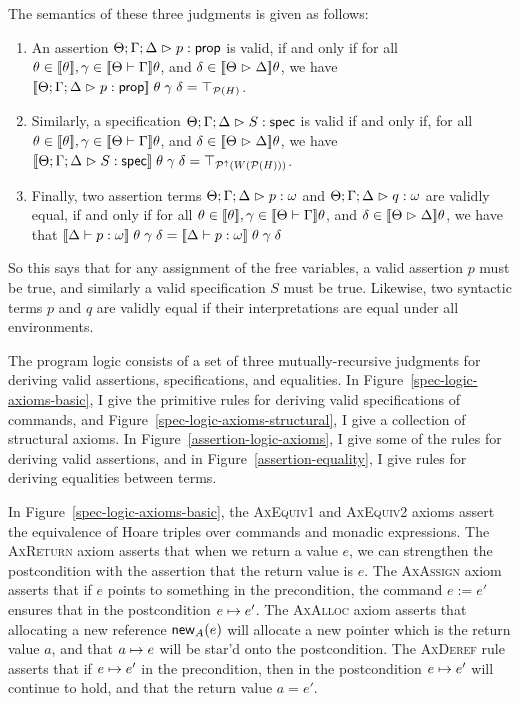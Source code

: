 \noindent The semantics of these three judgments is given as follows:
\begin{enumerate}
\item An assertion ${\Theta; \Gamma; \Delta} \vartriangleright {p} : {\mathsf{prop}}$ is valid, if and only
  if for all $\theta \in [\![{\theta}]\!], \gamma \in
  [\![{{\Theta} \vdash {\Gamma}}]\!]\theta$, and $\delta \in
  [\![{{\Theta} \vartriangleright {\Delta}}]\!]\theta$, we have
  $[\![{{\Theta; \Gamma; \Delta} \vartriangleright {p} : {\mathsf{prop}}}]\!]\;\theta\;\gamma\;\delta = \top_{\mathcal{P}(H)}$.

\item Similarly, a specification ${\Theta; \Gamma; \Delta} \vartriangleright {S} : \mathsf{spec}$ is valid if and only
if, for all $\theta \in [\![{\theta}]\!], \gamma \in
  [\![{{\Theta} \vdash {\Gamma}}]\!]\theta$, and $\delta \in
  [\![{{\Theta} \vartriangleright {\Delta}}]\!]\theta$, we have
$[\![{{\Theta; \Gamma; \Delta} \vartriangleright {S} : \mathsf{spec}}]\!]\;\theta\;\gamma\;\delta = \top_{\mathcal{P}^{\uparrow}({W(\mathcal{P}(H))})}$.

\item Finally, two assertion terms ${\Theta; \Gamma; \Delta} \vartriangleright {p} : {\omega}$ and
${\Theta; \Gamma; \Delta} \vartriangleright {q} : {\omega}$ are validly equal, if and only if for all 
$\theta \in [\![{\theta}]\!], \gamma \in
  [\![{{\Theta} \vdash {\Gamma}}]\!]\theta$, and $\delta \in
  [\![{{\Theta} \vartriangleright {\Delta}}]\!]\theta$, we have that
$[\![{{\Delta} \vdash {p} : {\omega}}]\!]\;\theta\;\gamma\;\delta = [\![{{\Delta} \vdash {p} : {\omega}}]\!]\;\theta\;\gamma\;\delta$
\end{enumerate}

So this says that for any assignment of the free variables, a valid
assertion $p$ must be true, and similarly a valid specification $S$
must be true. Likewise, two syntactic terms $p$ and $q$ are validly
equal if their interpretations are equal under all environments. 

The program logic consists of a set of three mutually-recursive
judgments for deriving valid assertions, specifications, and
equalities. In Figure~\ref{spec-logic-axioms-basic}, I give the
primitive rules for deriving valid specifications of commands, and
Figure~\ref{spec-logic-axioms-structural}, I give a collection of
structural axioms.  In Figure~\ref{assertion-logic-axioms}, I give
some of the rules for deriving valid assertions, and in
Figure~\ref{assertion-equality}, I give rules for deriving equalities
between terms.

In Figure~\ref{spec-logic-axioms-basic}, the \textsc{AxEquiv1} and
\textsc{AxEquiv2} axioms assert the equivalence of Hoare triples over
commands and monadic expressions.  The \textsc{AxReturn} axiom asserts
that when we return a value $e$, we can strengthen the postcondition
with the assertion that the return value is $e$. The \textsc{AxAssign}
axiom asserts that if $e$ points to something in the precondition, the
command $e := e'$ ensures that in the postcondition $e \mapsto
e'$. The \textsc{AxAlloc} axiom asserts that allocating a new
reference $\mathsf{new}_{A}(e)$ will allocate a new pointer which is the
return value $a$, and that $a \mapsto e$ will be star'd onto the
postcondition. The \textsc{AxDeref} rule asserts that if $e \mapsto
e'$ in the precondition, then in the postcondition $e \mapsto e'$
will continue to hold, and that the return value $a = e'$.

